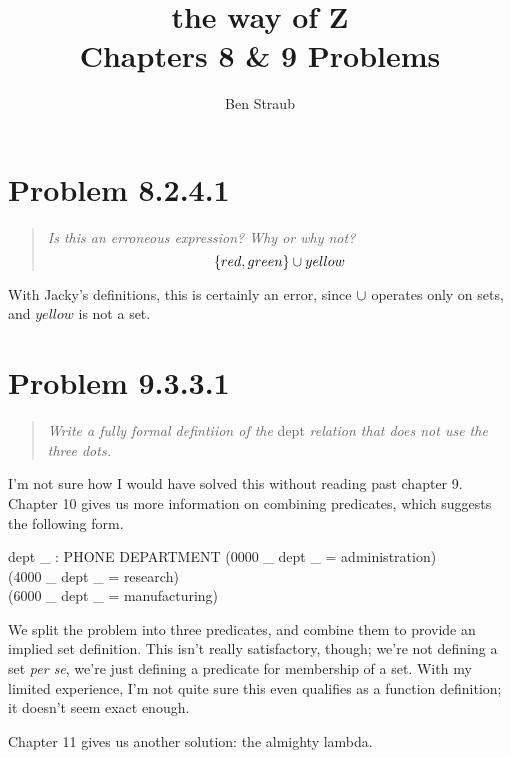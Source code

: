 \documentclass[10pt]{article}
\begin{document}
\title{the way of Z \\ Chapters 8 \& 9 Problems}
\author{Ben Straub}
\maketitle


\section{Problem 8.2.4.1}
\begin{quote}
  {\it Is this an erroneous expression?  Why or why not?
    \[ \{red, green\} \cup yellow \]}
\end{quote}

With Jacky's definitions, this is certainly an error, since $\cup$ operates only on sets, and
$yellow$ is not a set.



\section{Problem 9.3.3.1}
\begin{quote}
  {\it Write a fully formal defintiion of the} dept {\it relation that does not use the three dots.}
\end{quote}

I'm not sure how I would have solved this without reading past chapter 9.  Chapter 10 gives us more
information on combining predicates, which suggests the following form.

\begin{axdef}
  dept \_ : PHONE \rel DEPARTMENT
  \where
  (0000 \leq \_  \land dept \_ = administration) \lor \\
  (4000 \leq \_  \land dept \_ = research) \lor       \\
  (6000 \leq \_  \land dept \_ = manufacturing)
\end{axdef}

We split the problem into three predicates, and combine them to provide an implied set definition.
This isn't really satisfactory, though; we're not defining a set \textit{per se}, we're just
defining a predicate for membership of a set.  With my limited experience, I'm not quite sure
this even qualifies as a function definition; it doesn't seem exact enough.

Chapter 11 gives us another solution: the almighty lambda.
\end{document}
